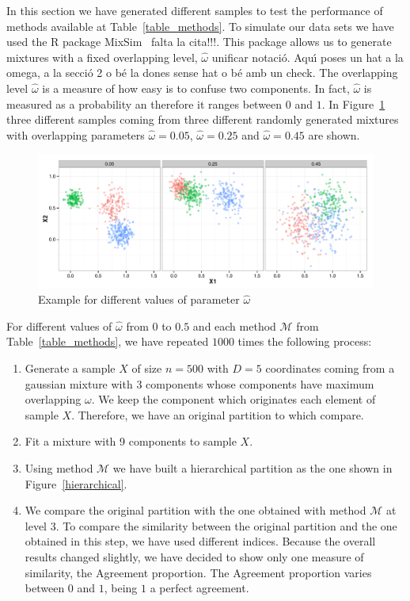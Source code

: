 \documentclass[10pt, a4paper]{article}
\begin{document}
\begin{spacing}{1.9}
In this section we have generated different samples to test the performance of methods available at Table~\ref{table_methods}. To simulate our data sets we have used the R package MixSim~\citep{Citar mixxim} {\color{blue} falta la cita!!!}. This package allows us to generate mixtures with a fixed overlapping level, $\hat{\omega}$ {\color{blue} unificar notaci\'{o}. Aqu\'{\i} poses un hat a la omega, a la secci\'{o} 2 o b\'{e} la dones sense hat o b\'{e} amb un check}. The overlapping level $\hat{\omega}$ is a measure of how easy is to confuse two components. In fact,  $\hat{\omega}$ is measured as a probability an therefore it ranges between $0$ and $1$. In Figure~\ref{omega} three different samples coming from three different randomly generated mixtures with overlapping parameters  $\hat{\omega}=0.05$, $\hat{\omega}=0.25$ and $\hat{\omega}=0.45$ are shown.

\begin{figure}[!t]
\centering
\includegraphics[scale=.5]{omega.pdf}
\caption{Example for different values of parameter $\hat{\omega}$}
\label{omega}
\end{figure}


For different values of $\hat{\omega}$ from $0$ to $0.5$ and each method $\mathcal{M}$ from Table~\ref{table_methods},  we  have repeated $1000$ times the following process:
\begin{enumerate}
\item Generate a sample $X$ of size $n=500$ with $D=5$ coordinates coming from a gaussian mixture with $3$ components whose components have maximum overlapping $\omega$. We keep the component which originates each element of sample $X$. Therefore, we have an original partition to which compare.
\item Fit a mixture with 9 components to sample $X$.
\item Using method $\mathcal{M}$ we have built a hierarchical partition as the one shown in Figure~\ref{hierarchical}.
\item We compare the original partition with the one obtained with method $\mathcal{M}$ at level $3$. To compare the similarity between the original partition and the one obtained in this step, we have used different indices. Because the overall results changed slightly, we have decided to show only one measure of similarity, the Agreement proportion. The Agreement proportion varies between $0$ and $1$, being $1$ a perfect agreement.
\end{enumerate}


\end{spacing}
\end{document}
